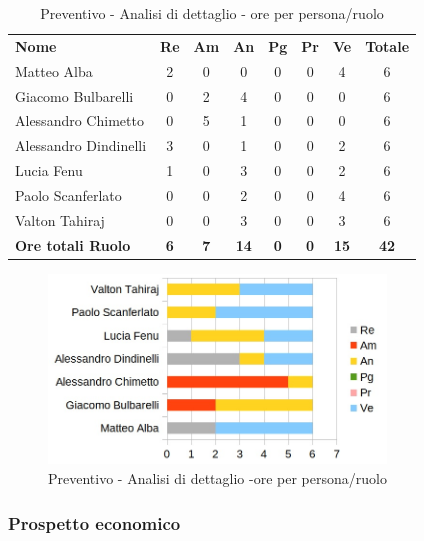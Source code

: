 		\begin{table} [h!]
			\begin{center}
				\begin{tabular} { m{3.5cm} c c c c c c c }
					\rowcolor{lightgray}
					\textbf{Nome} & \textbf{Re} & \textbf{Am} & \textbf{An} & \textbf{Pg} & \textbf{Pr} & \textbf{Ve} & \textbf{Totale} \\
					Matteo Alba & 2 & 0 & 0 & 0 & 0 & 4 & 6 \\
					Giacomo Bulbarelli & 0 & 2 & 4 & 0 & 0 & 0 & 6 \\
					Alessandro Chimetto & 0 & 5 & 1 & 0 & 0 & 0 & 6 \\
					Alessandro Dindinelli & 3 & 0 & 1 & 0 & 0 & 2 & 6 \\
					Lucia Fenu & 1 & 0 & 3 & 0 & 0 & 2 & 6 \\
					Paolo Scanferlato & 0 & 0 & 2 & 0 & 0 & 4 & 6 \\
					Valton Tahiraj & 0 & 0 & 3 & 0 & 0 & 3 & 6 \\
					\textbf{Ore totali Ruolo} & \textbf{6} & \textbf{7} & \textbf{14} & \textbf{0} & \textbf{0}& \textbf{15} & \textbf{42}
				\end{tabular}
				\caption{Preventivo - Analisi di dettaglio - ore per persona/ruolo}
			\end{center}
		\end{table}
	
		\begin{figure} [h!]
			\centering
			\includegraphics[width=0.8\textwidth]{res/img/grafici/consolidamento_dei_requisiti_ore_ruolo.jpg}
			\caption{Preventivo - Analisi di dettaglio -ore per persona/ruolo} 
		\end{figure}
		
	\newpage

	\subsubsection{Prospetto economico}
	

